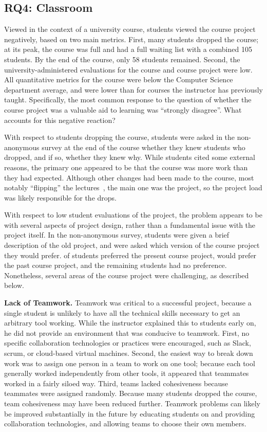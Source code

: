 \documentclass[10pt,conference]{IEEEtran}
\begin{document}
\subsection{RQ4: Classroom}

Viewed in the context of a university course,
students viewed the course project negatively,
based on two main metrics.
First, many students dropped the course; 
at its peak, the course was full and had a full
waiting list with a combined 105 students.
By the end of the course, only 58 students remained.
Second, the university-administered evaluations for
the course and course project were low.
All quantitative metrics for the course were below
the Computer Science department average, and were
lower than for courses the instructor has previously
taught.
Specifically, the most common response to the question
of whether the course project was a valuable aid to learning
was ``strongly disagree''.
What accounts for this negative reaction?

With respect to students dropping the course, students were asked
in the non-anonymous survey at the end of the course whether they knew
students who dropped, and if so, whether they knew why.
While students cited some external reasons, the 
primary one appeared to be that the course was more work
than they had expected.
Although other changes had been made to the course, 
most notably ``flipping'' the lectures~\cite{flipped},
the main one was the project, so the project load
was likely responsible for the drops.

With respect to low student evaluations of the project,
the problem appears to be with several aspects of project
design, rather than a fundamental issue with the project itself.
In the non-anonymous survey, students were given a brief description
of the old project, and were asked which version of the course project
they would prefer.
\projectLikeThis of students preferred the present course project,
\projectLikeOther would prefer the past course project,
and the remaining students had no preference.
Nonetheless, several areas of the course project were challenging,
as described below.

\textbf{Lack of Teamwork.}
  	Teamwork was critical to a successful project, because a single student
  	is unlikely to have all the technical skills necessary to get an
  	arbitrary tool working.
  	While the instructor explained this to students early on, 
  	he did not provide an environment that was conducive to teamwork.
  	First, no specific collaboration technologies or practices were encouraged,
  	such as Slack, scrum, or cloud-based virtual machines.
  	Second, the easiest way to break down work was to assign one person in a team
  	to work on one tool; because each tool generally worked independently
  	from other tools, it appeared that teammates worked in a fairly siloed way.  	
  	Third, teams lacked cohesiveness because teammates were assigned randomly.
  	Because many students dropped the course, team cohesiveness may have 
	been reduced further.
	Teamwork problems can likely be improved substantially in the future by 
	educating students on and providing collaboration technologies, and allowing
	teams to choose their own members. 
\end{document}
